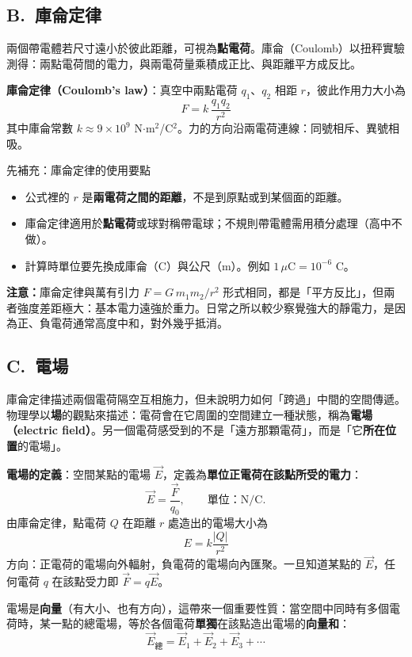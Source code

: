 \documentclass[11pt]{article}
\begin{document}
\subsection*{\sffamily B.\ 庫侖定律}

兩個帶電體若尺寸遠小於彼此距離，可視為\textbf{點電荷}。庫侖（Coulomb）以扭秤實驗測得：兩點電荷間的電力，與兩電荷量乘積成正比、與距離平方成反比。

\textbf{庫侖定律（Coulomb's law）}：真空中兩點電荷 $q_1$、$q_2$ 相距 $r$，彼此作用力大小為
$$\boxed{\;F = k\,\dfrac{q_1 q_2}{r^2}\;}$$
其中庫侖常數 $k\approx 9\times10^{9}$ N$\cdot$m$^2$/C$^2$。力的方向沿兩電荷連線：同號相斥、異號相吸。

\begin{補充框}{先補充：庫侖定律的使用要點}
\begin{itemize}\setlength{\itemsep}{1pt}
\item 公式裡的 $r$ 是\textbf{兩電荷之間的距離}，不是到原點或到某個面的距離。
\item 庫侖定律適用於\textbf{點電荷}或球對稱帶電球；不規則帶電體需用積分處理（高中不做）。
\item 計算時單位要先換成庫侖（C）與公尺（m）。例如 $1\,\mu$C$=10^{-6}$ C。
\end{itemize}
\textbf{注意：}庫侖定律與萬有引力 $F=G\,m_1m_2/r^2$ 形式相同，都是「平方反比」，但兩者強度差距極大：基本電力遠強於重力。日常之所以較少察覺強大的靜電力，是因為正、負電荷通常高度中和，對外幾乎抵消。
\end{補充框}

\subsection*{\sffamily C.\ 電場}

庫侖定律描述兩個電荷隔空互相施力，但未說明力如何「跨過」中間的空間傳遞。物理學以\textbf{場}的觀點來描述：電荷會在它周圍的空間建立一種狀態，稱為\textbf{電場（electric field）}。另一個電荷感受到的不是「遠方那顆電荷」，而是「它\textbf{所在位置}的電場」。

\textbf{電場的定義}：空間某點的電場 $\vec E$，定義為\textbf{單位正電荷在該點所受的電力}：
$$\vec E=\frac{\vec F}{q_0},\qquad \text{單位：N/C}.$$
由庫侖定律，點電荷 $Q$ 在距離 $r$ 處造出的電場大小為
$$\boxed{\;E=k\dfrac{|Q|}{r^2}\;}$$
方向：正電荷的電場向外輻射，負電荷的電場向內匯聚。一旦知道某點的 $\vec E$，任何電荷 $q$ 在該點受力即 $\vec F=q\vec E$。

電場是\textbf{向量}（有大小、也有方向），這帶來一個重要性質：當空間中同時有多個電荷時，某一點的總電場，等於各個電荷\textbf{單獨}在該點造出電場的\textbf{向量和}：
$$\vec E_{\text{總}}=\vec E_1+\vec E_2+\vec E_3+\cdots$$
\end{document}
